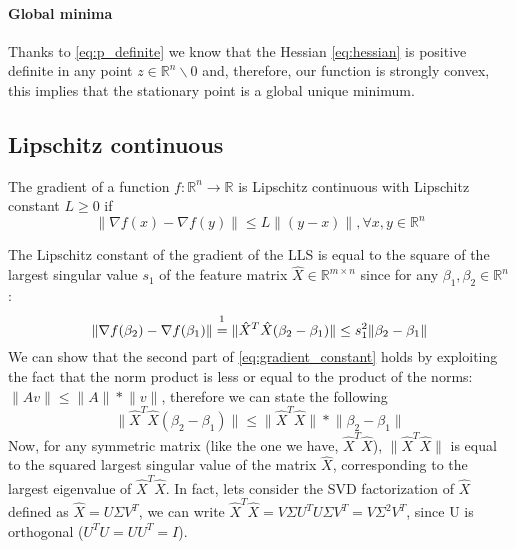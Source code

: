 \paragraph{Global minima}
\label{par:unique_global_minima}
Thanks to \eqref{eq:p_definite} we know that the Hessian \eqref{eq:hessian} is positive definite in any point $z \in \mathbb{R}^n\backslash 0$ and, therefore, our function is strongly convex, this implies that the stationary point is a global unique minimum.

\subsection{Lipschitz continuous}\label{subsec:lipschitz}
The gradient of a function $f: \mathbb{R}^n \xrightarrow{} \mathbb{R}$ is Lipschitz continuous with Lipschitz constant $L \geq 0$ if 
\begin{equation}
    \lVert \nabla f(x) - \nabla f(y) \rVert \leq L \lVert (y - x) \rVert, \forall x,y \in \mathbb{R}^n
\end{equation}

\noindent The Lipschitz constant of the gradient of the LLS is equal to the square of the largest singular value $s_1$ of the feature matrix $\hat{X} \in \mathbb{R}^{m\times n}$ since for any $\beta_1, \beta_2 \in \mathbb{R}^{n}$:
\begin{equation}
    \lVert \nabla f(\beta_2) - \nabla f(\beta_1) \rVert \stackrel{\footnotemark}{=} \lVert \hat{X}^T \hat{X} (\beta_2 - \beta_1) \rVert \leq s_{1}^2 \lVert \beta_2 - \beta_1 \rVert
    \label{eq:gradient_constant}
\end{equation}
We can show that the second part of \eqref{eq:gradient_constant} holds by exploiting the fact that the norm product is less or equal to the product of the norms: $\lVert A v \rVert \leq \lVert A \rVert * \lVert v \rVert$, therefore we can state the following
\begin{equation}
    \lVert \hat{X}^T \hat{X} (\beta_2 - \beta_1) \rVert \leq \lVert \hat{X}^T \hat{X} \rVert * \lVert \beta_2 - \beta_1 \rVert
\end{equation}
Now, for any symmetric matrix (like the one we have, $\hat{X}^T \hat{X}$), $\lVert \hat{X}^T \hat{X} \rVert$ is equal to the squared largest singular value of the matrix $\hat{X}$, corresponding to the largest eigenvalue of $\hat{X}^T \hat{X}$. In fact, lets consider the SVD factorization of $\hat{X}$ defined as $\hat{X} = U\Sigma V^T$, we can write $\hat{X}^T \hat{X} = V\Sigma U^T U \Sigma V^T = V \Sigma^2 V^T$, since U is orthogonal ($U^T U=U U^T=I$).
\vspace{3mm}

